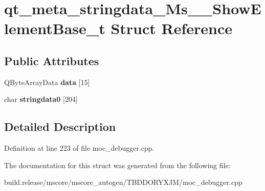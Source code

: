 \hypertarget{structqt__meta__stringdata___ms_____show_element_base__t}{}\section{qt\+\_\+meta\+\_\+stringdata\+\_\+\+Ms\+\_\+\+\_\+\+Show\+Element\+Base\+\_\+t Struct Reference}
\label{structqt__meta__stringdata___ms_____show_element_base__t}
\subsection*{Public Attributes}
\begin{DoxyCompactItemize}
\item 
\mbox{\label{structqt__meta__stringdata___ms_____show_element_base__t_a39d1278aa8e4f9950d336dac38b5b982}} 
Q\+Byte\+Array\+Data {\bfseries data} \mbox{[}15\mbox{]}
\item 
\mbox{\label{structqt__meta__stringdata___ms_____show_element_base__t_aec1fe53a98cceddb96ddc452615bfdf0}} 
char {\bfseries stringdata0} \mbox{[}204\mbox{]}
\end{DoxyCompactItemize}


\subsection{Detailed Description}


Definition at line 223 of file moc\+\_\+debugger.\+cpp.



The documentation for this struct was generated from the following file\+:\begin{DoxyCompactItemize}
\item 
build.\+release/mscore/mscore\+\_\+autogen/\+T\+B\+D\+D\+O\+R\+Y\+X\+J\+M/moc\+\_\+debugger.\+cpp\end{DoxyCompactItemize}
